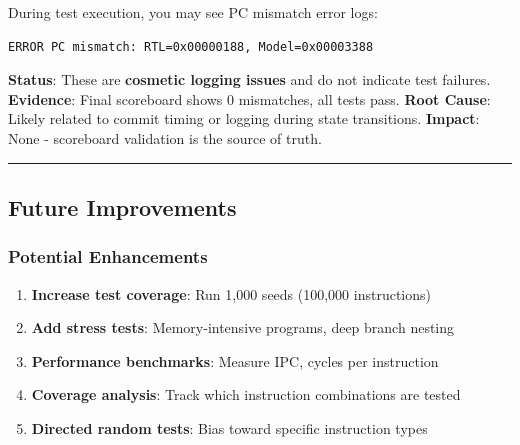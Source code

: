 \begin{record}

During test execution, you may see PC mismatch error logs:

\begin{lstlisting}[language={}]
ERROR PC mismatch: RTL=0x00000188, Model=0x00003388
\end{lstlisting}

\textbf{Status}: These are \textbf{cosmetic logging issues} and do not
indicate test failures. \textbf{Evidence}: Final scoreboard shows 0
mismatches, all tests pass. \textbf{Root Cause}: Likely related to
commit timing or logging during state transitions. \textbf{Impact}: None
- scoreboard validation is the source of truth.

\begin{center}\rule{0.5\linewidth}{0.5pt}\end{center}

\end{record}

\subsection{Future Improvements}\label{cr:status:random-tests-status:future-improvements}

\subsubsection{Potential Enhancements}\label{cr:status:random-tests-status:potential-enhancements}

\begin{record}

\begin{enumerate}
\def\labelenumi{\arabic{enumi}.}
\tightlist
\item
  \textbf{Increase test coverage}: Run 1,000 seeds (100,000
  instructions)
\item
  \textbf{Add stress tests}: Memory-intensive programs, deep branch
  nesting
\item
  \textbf{Performance benchmarks}: Measure IPC, cycles per instruction
\item
  \textbf{Coverage analysis}: Track which instruction combinations are
  tested
\item
  \textbf{Directed random tests}: Bias toward specific instruction types
\end{enumerate}

\end{record}

